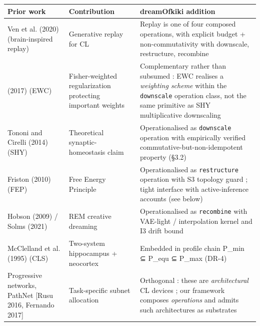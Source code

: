 \documentclass[
]{article}
\newcounter{none} %
\begin{document}
{\def\LTcaptype{none} %
\begin{longtable}[]{@{}
  >{\raggedright\arraybackslash}p{}
  >{\raggedright\arraybackslash}p{}
  >{\raggedright\arraybackslash}p{}@{}}
\toprule\noalign{}
\begin{minipage}[b]{\linewidth}\raggedright
Prior work
\end{minipage} & \begin{minipage}[b]{\linewidth}\raggedright
Contribution
\end{minipage} & \begin{minipage}[b]{\linewidth}\raggedright
dreamOfkiki addition
\end{minipage} \\
\midrule\noalign{}
\endhead
\bottomrule\noalign{}
\endlastfoot
Ven et al. (2020) (brain-inspired replay) & Generative replay for CL &
Replay is one of four composed operations, with explicit budget +
non-commutativity with downscale, restructure, recombine \\
{Kirkpatrick et al.} (2017) (EWC) & Fisher-weighted regularization
protecting important weights & Complementary rather than subsumed : EWC
realises a \emph{weighting scheme} within the \texttt{downscale}
operation class, not the same primitive as SHY multiplicative
downscaling \\
Tononi and Cirelli (2014) (SHY) & Theoretical synaptic-homeostasis claim
& Operationalised as \texttt{downscale} operation with empirically
verified commutative-but-non-idempotent property (§3.2) \\
Friston (2010) (FEP) & Free Energy Principle & Operationalised as
\texttt{restructure} operation with S3 topology guard ; tight interface
with active-inference accounts (see below) \\
Hobson (2009) / Solms (2021) & REM creative dreaming & Operationalised
as \texttt{recombine} with VAE-light / interpolation kernel and I3 drift
bound \\
McClelland et al. (1995) (CLS) & Two-system hippocampus + neocortex &
Embedded in profile chain P\_min ⊆ P\_equ ⊆ P\_max (DR-4) \\
Progressive networks, PathNet {[}Rusu 2016, Fernando 2017{]} &
Task-specific subnet allocation & Orthogonal : these are
\emph{architectural} CL devices ; our framework composes
\emph{operations} and admits such architectures as substrates \\

\end{longtable}}
\end{document}
